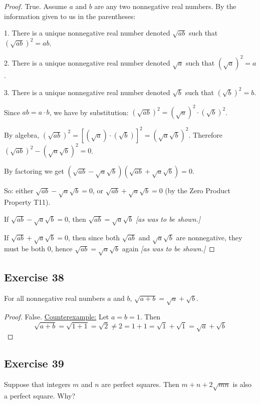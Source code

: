 \documentclass[14pt]{extarticle}
\begin{document}
\begin{proof}
True. Assume $a$ and $b$ are any two nonnegative real numbers. By the information given to us in the parentheses: 

1. There is a unique nonnegative real number denoted $\sqrt{ab}$ such that $(\sqrt{ab})^2 = ab$.

2. There is a unique nonnegative real number denoted $\sqrt{a}$ such that $(\sqrt{a})^2 = a$.

3. There is a unique nonnegative real number denoted $\sqrt{b}$ such that $(\sqrt{b})^2 = b$.

Since $ab = a \cdot b$, we have by substitution: $(\sqrt{ab})^2 = (\sqrt{a})^2 \cdot (\sqrt{b})^2$.

By algebra, $(\sqrt{ab})^2 = [(\sqrt{a}) \cdot (\sqrt{b})]^2 = (\sqrt{a}\sqrt{b})^2$. Therefore $(\sqrt{ab})^2 - (\sqrt{a}\sqrt{b})^2 = 0$.

By factoring we get $(\sqrt{ab} - \sqrt{a}\sqrt{b})(\sqrt{ab} + \sqrt{a}\sqrt{b}) = 0$.

So: either $\sqrt{ab} - \sqrt{a}\sqrt{b} = 0$, or $\sqrt{ab} + \sqrt{a}\sqrt{b} = 0$ (by the Zero Product Property T11).

If $\sqrt{ab} - \sqrt{a}\sqrt{b} = 0$, then $\sqrt{ab} = \sqrt{a}\sqrt{b}$ {\it [as was to be shown.]}

If $\sqrt{ab} + \sqrt{a}\sqrt{b} = 0$, then since both $\sqrt{ab}$ and $\sqrt{a}\sqrt{b}$ are nonnegative, they must be both 0, hence $\sqrt{ab} = \sqrt{a}\sqrt{b}$ again {\it [as was to be shown.]}
\end{proof}

\subsection{Exercise 38}
For all nonnegative real numbers $a$ and $b$, $\sqrt{a + b} = \sqrt{a} + \sqrt{b}$.

\begin{proof}
False. \underline{Counterexample:} Let $a = b = 1$. Then 
\[
\sqrt{a+b} = \sqrt{1+1} = \sqrt{2} \neq 2 = 1 + 1 = \sqrt{1} + \sqrt{1} = \sqrt{a} + \sqrt{b}
\]
\end{proof}

\subsection{Exercise 39}
Suppose that integers $m$ and $n$ are perfect squares. Then $m + n + 2\sqrt{mn}$ is also a perfect square. Why?
\end{document}
